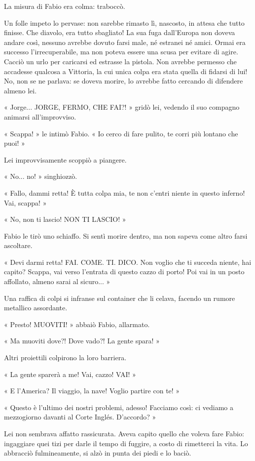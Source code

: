 La misura di Fabio era colma: traboccò. 

Un folle impeto lo pervase: non sarebbe rimasto lì, nascosto, in attesa che tutto finisse. Che diavolo, era tutto sbagliato! La sua fuga dall'Europa non doveva andare così, nessuno avrebbe dovuto farsi male, né estranei né amici. Ormai era successo l'irrecuperabile, ma non poteva essere una scusa per evitare di agire. Cacciò un urlo per caricarsi ed estrasse la pistola. Non avrebbe permesso che accadesse qualcosa a Vittoria, la cui unica colpa era stata quella di fidarsi di lui! No, non se ne parlava: se doveva morire, lo avrebbe fatto cercando di difendere almeno lei.

« Jorge... JORGE, FERMO, CHE FAI?! » gridò lei, vedendo il suo compagno animarsi all'improvviso.

« Scappa! » le intimò Fabio. « Io cerco di fare pulito, te corri più lontano che puoi! »

Lei improvvisamente scoppiò a piangere.

« No... no! » singhiozzò.

« Fallo, dammi retta! È tutta colpa mia, te non c'entri niente in questo inferno! Vai, scappa! »

« No, non ti lascio! NON TI LASCIO! »

Fabio le tirò uno schiaffo. Si sentì morire dentro, ma non sapeva come altro farsi ascoltare.

« Devi darmi retta! FAI. COME. TI. DICO. Non voglio che ti succeda niente, hai capito? Scappa, vai verso l'entrata di questo cazzo di porto! Poi vai in un posto affollato, almeno sarai al sicuro... »

Una raffica di colpi si infranse sul container che li celava, facendo un rumore metallico assordante.

« Presto! MUOVITI! » abbaiò Fabio, allarmato.

« Ma muoviti dove?! Dove vado?! La gente spara! »

Altri proiettili colpirono la loro barriera.

« La gente sparerà a me! Vai, cazzo! VAI! »

« E l'America? Il viaggio, la nave! Voglio partire con te! »

« Questo è l'ultimo dei nostri problemi, adesso! Facciamo così: ci vediamo a mezzogiorno davanti al Corte Inglés. D'accordo? »

Lei non sembrava affatto rassicurata. Aveva capito quello che voleva fare Fabio: ingaggiare quei tizi per darle il tempo di fuggire, a costo di rimetterci la vita. Lo abbracciò fulmineamente, si alzò in punta dei piedi e lo baciò.

